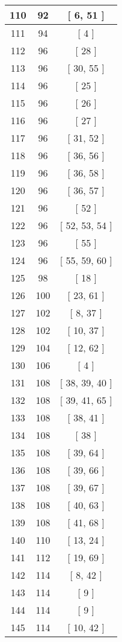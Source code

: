 \begin{center}
\begin{longtable}[H]{|| c c c ||}
\hline
110 & 92 & [ 6, 51 ] \\ 
\hline
111 & 94 & [ 4 ] \\ 
\hline
112 & 96 & [ 28 ] \\ 
\hline
113 & 96 & [ 30, 55 ] \\ 
\hline
114 & 96 & [ 25 ] \\ 
\hline
115 & 96 & [ 26 ] \\ 
\hline
116 & 96 & [ 27 ] \\ 
\hline
117 & 96 & [ 31, 52 ] \\ 
\hline
118 & 96 & [ 36, 56 ] \\ 
\hline
119 & 96 & [ 36, 58 ] \\ 
\hline
120 & 96 & [ 36, 57 ] \\ 
\hline
121 & 96 & [ 52 ] \\ 
\hline
122 & 96 & [ 52, 53, 54 ] \\ 
\hline
123 & 96 & [ 55 ] \\ 
\hline
124 & 96 & [ 55, 59, 60 ] \\ 
\hline
125 & 98 & [ 18 ] \\ 
\hline
126 & 100 & [ 23, 61 ] \\ 
\hline
127 & 102 & [ 8, 37 ] \\ 
\hline
128 & 102 & [ 10, 37 ] \\ 
\hline
129 & 104 & [ 12, 62 ] \\ 
\hline
130 & 106 & [ 4 ] \\ 
\hline
131 & 108 & [ 38, 39, 40 ] \\ 
\hline
132 & 108 & [ 39, 41, 65 ] \\ 
\hline
133 & 108 & [ 38, 41 ] \\ 
\hline
134 & 108 & [ 38 ] \\ 
\hline
135 & 108 & [ 39, 64 ] \\ 
\hline
136 & 108 & [ 39, 66 ] \\ 
\hline
137 & 108 & [ 39, 67 ] \\ 
\hline
138 & 108 & [ 40, 63 ] \\ 
\hline
139 & 108 & [ 41, 68 ] \\ 
\hline
140 & 110 & [ 13, 24 ] \\ 
\hline
141 & 112 & [ 19, 69 ] \\ 
\hline
142 & 114 & [ 8, 42 ] \\ 
\hline
143 & 114 & [ 9 ] \\ 
\hline
144 & 114 & [ 9 ] \\ 
\hline
145 & 114 & [ 10, 42 ] \\ 

\end{longtable}
\end{center}
